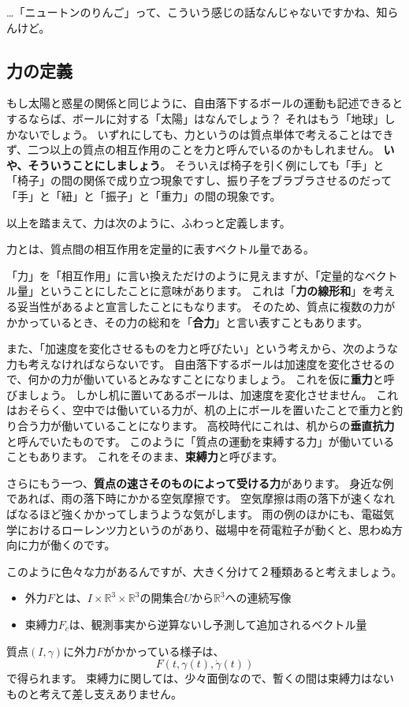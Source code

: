 …「ニュートンのりんご」って、こういう感じの話なんじゃないですかね、知らんけど。

\subsection{力の定義}

もし太陽と惑星の関係と同じように、自由落下するボールの運動も記述できるとするならば、ボールに対する「太陽」はなんでしょう？
それはもう「地球」しかないでしょう。
いずれにしても、力というのは質点単体で考えることはできず、二つ以上の質点の相互作用のことを力と呼んでいるのかもしれません。
\textbf{いや、そういうことにしましょう}。
そういえば椅子を引く例にしても「手」と「椅子」の間の関係で成り立つ現象ですし、振り子をブラブラさせるのだって「手」と「紐」と「振子」と「重力」の間の現象です。

以上を踏まえて、力は次のように、ふわっと定義します。
\begin{definition}
  力とは、質点間の相互作用を定量的に表すベクトル量である。
\end{definition}
「力」を「相互作用」に言い換えただけのように見えますが、「定量的なベクトル量」ということにしたことに意味があります。
これは「\textbf{力の線形和}」を考える妥当性があるよと宣言したことにもなります。
そのため、質点に複数の力がかかっているとき、その力の総和を「\textbf{合力}」と言い表すこともあります。

また、「加速度を変化させるものを力と呼びたい」という考えから、次のような力も考えなければならないです。
自由落下するボールは加速度を変化させるので、何かの力が働いているとみなすことになりましょう。
これを仮に\textbf{重力}と呼びましょう。
しかし机に置いてあるボールは、加速度を変化させません。
これはおそらく、空中では働いている力が、机の上にボールを置いたことで重力と釣り合う力が働いていることになります。
高校時代にこれは、机からの\textbf{垂直抗力}と呼んでいたものです。
このように「質点の運動を束縛する力」が働いていることもあります。
これをそのまま、\textbf{束縛力}と呼びます。

さらにもう一つ、\textbf{質点の速さそのものによって受ける力}があります。
身近な例であれば、雨の落下時にかかる空気摩擦です。
空気摩擦は雨の落下が速くなればなるほど強くかかってしまうような気がします。
雨の例のほかにも、電磁気学におけるローレンツ力というのがあり、磁場中を荷電粒子が動くと、思わぬ方向に力が働くのです。

このように色々な力があるんですが、大きく分けて２種類あると考えましょう。
\begin{itemize}
  \item 外力$F$とは、$I\times\mathbb{R}^3\times\mathbb{R}^3$の開集合$U$から$\mathbb{R}^3$への連続写像
  \item 束縛力$F_c$は、観測事実から逆算ないし予測して追加されるベクトル量
\end{itemize}
質点$(I,\gamma)$に外力$F$がかかっている様子は、
\[
  F(t,\gamma(t),\dot\gamma(t))
\]
で得られます。
束縛力に関しては、少々面倒なので、暫くの間は束縛力はないものと考えて差し支えありません。

